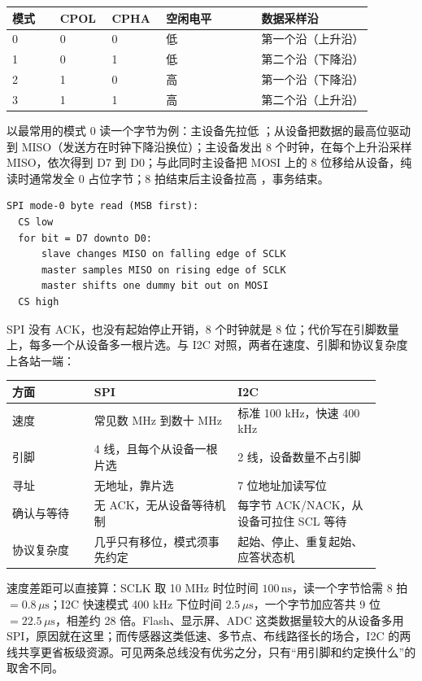 \begin{longtable}{L{0.12\linewidth}L{0.12\linewidth}L{0.12\linewidth}L{0.24\linewidth}L{0.28\linewidth}}
\toprule
模式 & CPOL & CPHA & 空闲电平 & 数据采样沿 \\
 & 0 & 0 & 低 & 第一个沿（上升沿） \\
1 & 0 & 1 & 低 & 第二个沿（下降沿） \\
2 & 1 & 0 & 高 & 第一个沿（下降沿） \\
3 & 1 & 1 & 高 & 第二个沿（上升沿） \\
\bottomrule
\end{longtable}

以最常用的模式 0 读一个字节为例：主设备先拉低 ；从设备把数据的最高位驱动到 MISO（发送方在时钟下降沿换位）；主设备发出 8 个时钟，在每个上升沿采样 MISO，依次得到 D7 到 D0；与此同时主设备把 MOSI 上的 8 位移给从设备，纯读时通常发全 0 占位字节；8 拍结束后主设备拉高 ，事务结束。

\begin{lstlisting}
SPI mode-0 byte read (MSB first):
  CS low
  for bit = D7 downto D0:
      slave changes MISO on falling edge of SCLK
      master samples MISO on rising edge of SCLK
      master shifts one dummy bit out on MOSI
  CS high
\end{lstlisting}

SPI 没有 ACK，也没有起始停止开销，8 个时钟就是 8 位；代价写在引脚数量上，每多一个从设备多一根片选。与 I2C 对照，两者在速度、引脚和协议复杂度上各站一端：

\begin{longtable}{L{0.20\linewidth}L{0.35\linewidth}L{0.35\linewidth}}
\toprule
方面 & SPI & I2C \\
\midrule
速度 & 常见数 MHz 到数十 MHz & 标准 100 kHz，快速 400 kHz \\
引脚 & 4 线，且每个从设备一根片选 & 2 线，设备数量不占引脚 \\
寻址 & 无地址，靠片选 & 7 位地址加读写位 \\
确认与等待 & 无 ACK，无从设备等待机制 & 每字节 ACK/NACK，从设备可拉住 SCL 等待 \\
协议复杂度 & 几乎只有移位，模式须事先约定 & 起始、停止、重复起始、应答状态机 \\
\bottomrule
\end{longtable}

速度差距可以直接算：SCLK 取 10 MHz 时位时间 $100\,\text{ns}$，读一个字节恰需 8 拍 $=0.8\,\mu\text{s}$；I2C 快速模式 400 kHz 下位时间 $2.5\,\mu\text{s}$，一个字节加应答共 9 位 $=22.5\,\mu\text{s}$，相差约 28 倍。Flash、显示屏、ADC 这类数据量较大的从设备多用 SPI，原因就在这里；而传感器这类低速、多节点、布线路径长的场合，I2C 的两线共享更省板级资源。可见两条总线没有优劣之分，只有“用引脚和约定换什么”的取舍不同。

